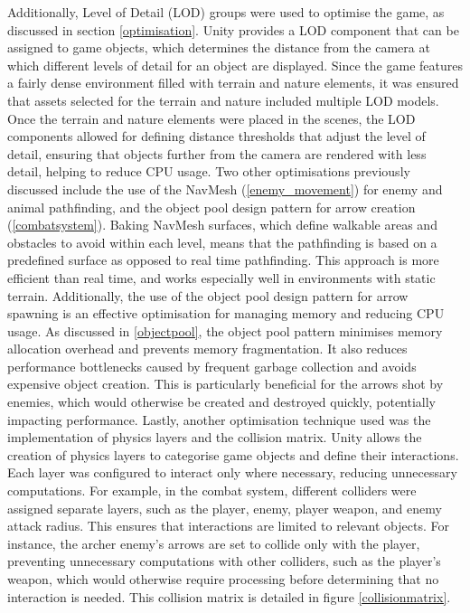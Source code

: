 \documentclass[10pt]{final_report}
\begin{document}
Additionally, Level of Detail (LOD) groups were used to optimise the game, as discussed in section \ref{optimisation}. Unity provides a LOD component that can be assigned to game objects, which determines the distance from the camera at which different levels of detail for an object are displayed. Since the game features a fairly dense environment filled with terrain and nature elements, it was ensured that assets selected for the terrain and nature included multiple LOD models. Once the terrain and nature elements were placed in the scenes, the LOD components allowed for defining distance thresholds that adjust the level of detail, ensuring that objects further from the camera are rendered with less detail, helping to reduce CPU usage.
\newline
Two other optimisations previously discussed include the use of the NavMesh (\ref{enemy_movement}) for enemy and animal pathfinding, and the object pool design pattern for arrow creation (\ref{combatsystem}). Baking NavMesh surfaces, which define walkable areas and obstacles to avoid within each level, means that the pathfinding is based on a predefined surface as opposed to real time pathfinding. This approach is more efficient than real time, and works especially well in environments with static terrain. Additionally, the use of the object pool design pattern for arrow spawning is an effective optimisation for managing memory and reducing CPU usage. As discussed in \ref{objectpool}, the object pool pattern minimises memory allocation overhead and prevents memory fragmentation. It also reduces performance bottlenecks caused by frequent garbage collection and avoids expensive object creation. This is particularly beneficial for the arrows shot by enemies, which would otherwise be created and destroyed quickly, potentially impacting performance.
\newline 
Lastly, another optimisation technique used was the implementation of physics layers and the collision matrix. Unity allows the creation of physics layers to categorise game objects and define their interactions. Each layer was configured to interact only where necessary, reducing unnecessary computations. For example, in the combat system, different colliders were assigned separate layers, such as the player, enemy, player weapon, and enemy attack radius. This ensures that interactions are limited to relevant objects. For instance, the archer enemy’s arrows are set to collide only with the player, preventing unnecessary computations with other colliders, such as the player’s weapon, which would otherwise require processing before determining that no interaction is needed. This collision matrix is detailed in figure \ref{collisionmatrix}.
\end{document}
